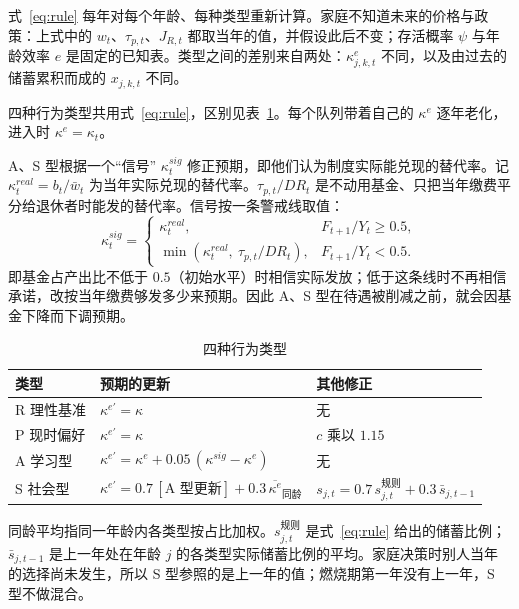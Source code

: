 \documentclass[UTF8,11pt,a4paper]{ctexart}
\begin{document}
式~\eqref{eq:rule} 每年对每个年龄、每种类型重新计算。家庭不知道未来的价格与政策：上式中的 $w_t$、$\tau_{p,t}$、$J_{R,t}$ 都取当年的值，并假设此后不变；存活概率 $\psi$ 与年龄效率 $e$ 是固定的已知表。类型之间的差别来自两处：$\kappa^e_{j,k,t}$ 不同，以及由过去的储蓄累积而成的 $x_{j,k,t}$ 不同。

四种行为类型共用式~\eqref{eq:rule}，区别见表~\ref{tab:types}。每个队列带着自己的 $\kappa^e$ 逐年老化，进入时 $\kappa^e=\kappa_t$。

A、S 型根据一个“信号” $\kappa^{sig}_t$ 修正预期，即他们认为制度实际能兑现的替代率。记 $\kappa^{real}_t=b_t/\bar w_t$ 为当年实际兑现的替代率。$\tau_{p,t}/DR_t$ 是不动用基金、只把当年缴费平分给退休者时能发的替代率。信号按一条警戒线取值：
\begin{equation}\label{eq:signal}
  \kappa^{sig}_t =
  \begin{cases}
    \kappa^{real}_t, & F_{t+1}/Y_t \ge 0.5,\\[2pt]
    \min\!\left(\kappa^{real}_t,\ \tau_{p,t}/DR_t\right), & F_{t+1}/Y_t < 0.5.
  \end{cases}
\end{equation}
即基金占产出比不低于 $0.5$（初始水平）时相信实际发放；低于这条线时不再相信承诺，改按当年缴费够发多少来预期。因此 A、S 型在待遇被削减之前，就会因基金下降而下调预期。

\begin{table}[H]
\centering\small
\caption{四种行为类型}\label{tab:types}
\begin{tabular}{llp{4.6cm}}
\toprule
类型 & 预期的更新 & 其他修正 \\
\midrule
R 理性基准 & $\kappa^{e\prime} = \kappa$ & 无 \\
P 现时偏好 & $\kappa^{e\prime} = \kappa$ & $c$ 乘以 $1.15$ \\
A 学习型 & $\kappa^{e\prime} = \kappa^{e} + 0.05\,(\kappa^{sig} - \kappa^{e})$ & 无 \\
S 社会型 & $\kappa^{e\prime} = 0.7\,[\text{A 型更新}] + 0.3\,\overline{\kappa^{e}}_{\text{同龄}}$ & $s_{j,t} = 0.7\,s^{\text{规则}}_{j,t} + 0.3\,\bar s_{j,t-1}$ \\
\bottomrule
\end{tabular}
\end{table}

同龄平均指同一年龄内各类型按占比加权。$s^{\text{规则}}_{j,t}$ 是式~\eqref{eq:rule} 给出的储蓄比例；$\bar s_{j,t-1}$ 是上一年处在年龄 $j$ 的各类型实际储蓄比例的平均。家庭决策时别人当年的选择尚未发生，所以 S 型参照的是上一年的值；燃烧期第一年没有上一年，S 型不做混合。
\end{document}
